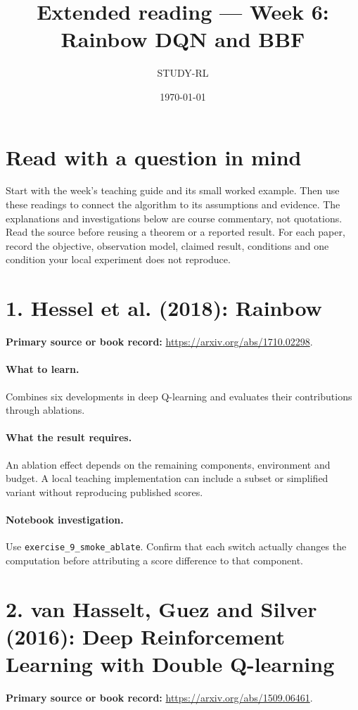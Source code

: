 \documentclass[11pt]{scrartcl}
\title{Extended reading --- Week 6: Rainbow DQN and BBF}
\author{STUDY-RL}
\date{\today}
\begin{document}
\maketitle
\section*{Read with a question in mind}
Start with the week's teaching guide and its small worked example. Then use
these readings to connect the algorithm to its assumptions and evidence.
The explanations and investigations below are course commentary, not
quotations. Read the source before reusing a theorem or a reported result.
For each paper, record the objective, observation model, claimed result,
conditions and one condition your local experiment does not reproduce.

\section*{1. Hessel et al. (2018): Rainbow}
\textbf{Primary source or book record:} \url{https://arxiv.org/abs/1710.02298}.

\paragraph{What to learn.} Combines six developments in deep Q-learning and evaluates their contributions through ablations.

\paragraph{What the result requires.} An ablation effect depends on the remaining components, environment and budget. A local teaching implementation can include a subset or simplified variant without reproducing published scores.

\paragraph{Notebook investigation.} Use \texttt{exercise\_9\_smoke\_ablate}. Confirm that each switch actually changes the computation before attributing a score difference to that component.

\section*{2. van Hasselt, Guez and Silver (2016): Deep Reinforcement Learning with Double Q-learning}
\textbf{Primary source or book record:} \url{https://arxiv.org/abs/1509.06461}.
\end{document}
